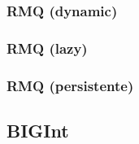 \subsubsection{RMQ (dynamic)}

\subsubsection{RMQ (lazy)}

\subsubsection{RMQ (persistente)}


\subsection{BIGInt}


